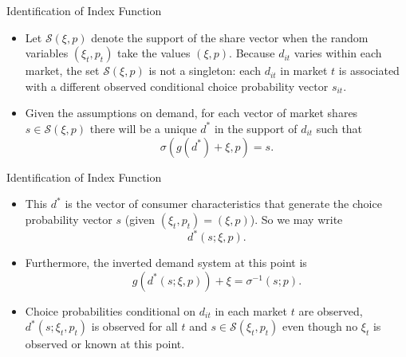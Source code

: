 \documentclass[aspectratio=169]{beamer}  %
\begin{document}
 
\begin{frame}{Identification of Index Function}
    \begin{itemize}
    \item Let \(\mathcal{S}(\xi, p)\) denote the support of the share vector when the random variables \((\xi_t, p_t)\) take the values \((\xi, p)\). Because \(d_{it}\) varies within each market, the set \(\mathcal{S}(\xi, p)\) is not a singleton: each \(d_{it}\) in market \(t\) is associated with a different observed conditional choice probability vector \(s_{it}\).
    \item Given the assumptions on demand, for each vector of market shares \(s \in \mathcal{S}(\xi, p)\) there will be a unique \(d^*\) in the support of \(d_{it}\) such that
    \begin{equation}
        \sigma(g(d^*) + \xi, p) = s.
    \end{equation}
    \end{itemize}
\end{frame}

\begin{frame}{Identification of Index Function}
    \begin{itemize}
    \item This \(d^*\) is the vector of consumer characteristics that generate the choice probability vector \(s\) (given \((\xi_t, p_t) = (\xi, p)\)). So we may write
    \begin{equation}
        d^*(s; \xi, p).
    \end{equation}
    \item Furthermore, the inverted demand system at this point is
    \begin{equation}
        g(d^*(s; \xi, p)) + \xi = \sigma^{-1}(s; p).
    \end{equation}
    \item Choice probabilities conditional on \(d_{it}\) in each market \(t\) are observed, \(d^*(s; \xi_t, p_t)\) is observed for all \(t\) and \(s \in \mathcal{S}(\xi_t, p_t)\) even though no \(\xi_t\) is observed or known at this point.
    \end{itemize}
\end{frame}
\end{document}
